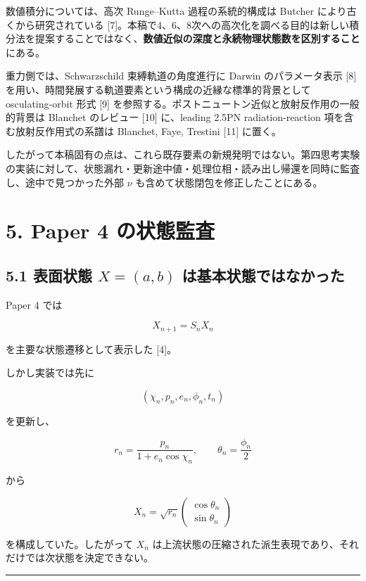 \documentclass[
  a4paper,
]{ltjsarticle}
\begin{document}
数値積分については、高次 Runge--Kutta 過程の系統的構成は Butcher
により古くから研究されている
{[}7{]}。本稿で4、6、8次への高次化を調べる目的は新しい積分法を提案することではなく、\textbf{数値近似の深度と永続物理状態数を区別すること}にある。

重力側では、Schwarzschild 束縛軌道の角度進行に Darwin のパラメータ表示
{[}8{]} を用い、時間発展する軌道要素という構成の近縁な標準的背景として
osculating-orbit 形式 {[}9{]}
を参照する。ポストニュートン近似と放射反作用の一般的背景は Blanchet
のレビュー {[}10{]} に、leading 2.5PN radiation-reaction
項を含む放射反作用式の系譜は Blanchet, Faye, Trestini {[}11{]} に置く。

したがって本稿固有の点は、これら既存要素の新規発明ではない。第四思考実験の実装に対して、状態漏れ・更新途中値・処理位相・読み出し帰還を同時に監査し、途中で見つかった外部
\(\nu\) も含めて状態閉包を修正したことにある。

\section{5. Paper 4
の状態監査}\label{paper-4-ux306eux72b6ux614bux76e3ux67fb}

\subsection{\texorpdfstring{5.1 表面状態 \(X=(a,b)\)
は基本状態ではなかった}{5.1 表面状態 X=(a,b) は基本状態ではなかった}}\label{ux8868ux9762ux72b6ux614b-xab-ux306fux57faux672cux72b6ux614bux3067ux306fux306aux304bux3063ux305f}

Paper 4 では

\[
X_{n+1}=S_nX_n
\]

を主要な状態遷移として表示した {[}4{]}。

しかし実装では先に

\[
(\chi_n,p_n,e_n,\phi_n,t_n)
\]

を更新し、

\[
r_n=\frac{p_n}{1+e_n\cos\chi_n},
\qquad
\theta_n=\frac{\phi_n}{2}
\]

から

\[
X_n
=
\sqrt{r_n}
\begin{pmatrix}
\cos\theta_n\\
\sin\theta_n
\end{pmatrix}
\]

を構成していた。したがって \(X_n\)
は上流状態の圧縮された派生表現であり、それだけでは次状態を決定できない。

\begin{center}\rule{0.5\linewidth}{0.5pt}\end{center}
\end{document}
